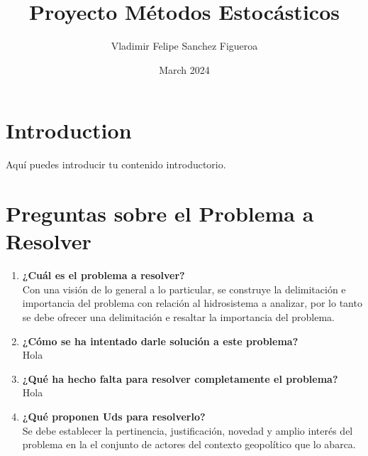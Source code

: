 \documentclass{article}
\title{Proyecto Métodos Estocásticos}
\author{Vladimir Felipe Sanchez Figueroa}
\date{March 2024}
\begin{document}
\maketitle

\section{Introduction}

Aquí puedes introducir tu contenido introductorio.

\section{Preguntas sobre el Problema a Resolver}

\begin{enumerate}
    \item \textbf{¿Cuál es el problema a resolver?} \\
    Con una visión de lo general a lo particular, se construye la delimitación e importancia del problema con relación al hidrosistema a analizar, por lo tanto se debe ofrecer una delimitación e resaltar la importancia del problema.
    
    \item \textbf{¿Cómo se ha intentado darle solución a este problema?}\\
    Hola
    
    
    \item \textbf{¿Qué ha hecho falta para resolver completamente el problema?}\\
    Hola
    
    \item \textbf{¿Qué proponen Uds para resolverlo?} \\
    Se debe establecer la pertinencia, justificación, novedad y amplio interés del problema en la el conjunto de actores del contexto geopolítico que lo abarca.
\end{enumerate}
\end{document}
